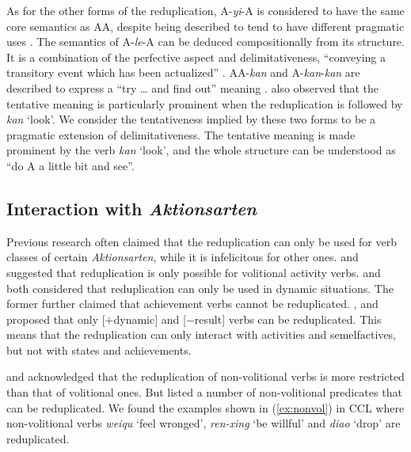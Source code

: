 \documentclass[11pt,a4paper,fleqn,draft]{article}
\begin{document}
As for the other forms of the reduplication, 
A-\emph{yi}-A is considered to have the same core semantics as AA,
despite being described to tend to have different pragmatic uses \citep{Yang2003}. 
The semantics of A-\emph{le}-A can be deduced compositionally from its structure. 
It is a combination of the perfective aspect and delimitativeness, ``conveying a transitory event which has been actualized'' \citep[151]{XiaoMcEnery2004}.
AA-\emph{kan} and A-\emph{kan}-\emph{kan} are described to express a ``try \ldots{} and find out'' meaning \citep[63]{Cheng2012}.
\citet[290]{Tsao2001} also observed that the tentative meaning is particularly prominent when the reduplication is followed by \emph{kan} `look'.
We consider the tentativeness implied by these two forms to be a pragmatic extension of delimitativeness.
The tentative meaning is made prominent by the verb \emph{kan} `look',
and the whole structure can be understood as ``do A a little bit and see''.




\subsection{Interaction with \emph{Aktionsarten}}\label{sec:Aktionsarten}

Previous research often claimed that the reduplication can only be used for verb classes of certain \emph{Aktionsarten}, while it is infelicitous for other ones.
\citet[277--278]{Hong1999} and \citet[234--235]{LiThompson1981} suggested that reduplication is only possible for volitional activity verbs.
\citet[70--71]{Dai1997} and \citet[290]{Tsao2001} both considered that reduplication can only be used in dynamic situations.
The former further claimed that achievement verbs cannot be reduplicated.
\citet[20]{Arcodiaetal2014}, \citet{BascianoMelloni2017} and \citet[155]{XiaoMcEnery2004} proposed that only [$+$dynamic] and [$-$result] verbs can be reduplicated.
This means that the reduplication can only interact with activities and semelfactives, but not with states and achievements.

\citet[53]{Chen2001} and \citet[10--11]{Yang2003} acknowledged that the reduplication of non\hyp{}volitional verbs is more restricted than that of volitional ones.
But \citet[381--382]{Zhu1998} listed a number of non\hyp{}volitional predicates that can be reduplicated.
We found the examples shown in (\ref{ex:nonvol}) in CCL where non\hyp{}volitional verbs \emph{weiqu} `feel wronged', \emph{ren-xing} `be willful' and \emph{diao} `drop' are reduplicated.
\end{document}
